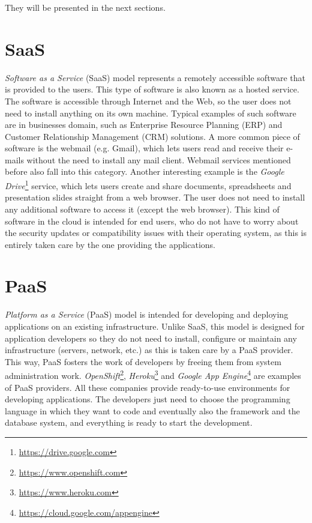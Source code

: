 They will be presented in the next sections.





\section{SaaS}
\textit{Software as a Service} (SaaS) model represents a remotely accessible software that is provided to the users. 
This type of software is also known as a hosted service. 
The software is accessible through Internet and the Web, so the user does not need to install anything on its own machine. 
Typical examples of such software are in businesses domain, such as Enterprise Resource Planning (ERP) and Customer Relationship Management (CRM) solutions. 
A more common piece of software is the webmail (e.g. Gmail), which lets users read and receive their e-mails without the need to install any mail client. 
Webmail services mentioned before also fall into this category. 
Another interesting example is the \textit{Google Drive}\footnote{\url{https://drive.google.com}} service, which lets users create and share documents, spreadsheets and presentation slides straight from a web browser. 
The user does not need to install any additional software to access it (except the web browser). 
This kind of software in the cloud is intended for end users, who do not have to worry about the security updates or compatibility issues with their operating system, as this is entirely taken care by the one providing the applications.


\section{PaaS}
 \textit{Platform as a Service} (PaaS) model is intended for developing and deploying applications on an existing infrastructure.
Unlike SaaS, this model is designed for application developers so they do not need to install, configure or maintain any infrastructure (servers, network, etc.) as this is taken care by a PaaS provider. 
This way, PaaS fosters the work of developers by freeing them from system administration work. 
\textit{OpenShift}\footnote{\url{https://www.openshift.com}}, \textit{Heroku}\footnote{\url{https://www.heroku.com}} and \textit{Google App Engine}\footnote{\url{https://cloud.google.com/appengine}} are examples of PaaS providers.
All these companies provide ready-to-use environments for developing applications.
The developers just need to choose the programming language in which they want to code and eventually also the framework and the database system, and everything is ready to start the development.



